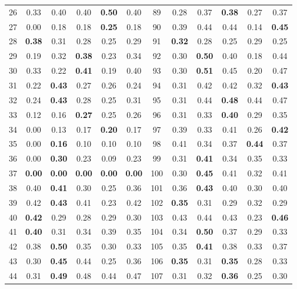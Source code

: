 \documentclass{article}
\begin{document}
{\begin{longtable}{cccccc@{\qquad}cccccc}
26 & 0.33 & 0.40 & 0.40 & \textbf{0.50} & 0.40 & 89 & 0.28 & 0.37 & \textbf{0.38} & 0.27 & 0.37 \\
27 & 0.00 & 0.18 & 0.18 & \textbf{0.25} & 0.18 & 90 & 0.39 & 0.44 & 0.44 & 0.14 & \textbf{0.45} \\
28 & \textbf{0.38} & 0.31 & 0.28 & 0.25 & 0.29 & 91 & \textbf{0.32} & 0.28 & 0.25 & 0.29 & 0.25 \\
29 & 0.19 & 0.32 & \textbf{0.38} & 0.23 & 0.34 & 92 & 0.30 & \textbf{0.50} & 0.40 & 0.18 & 0.44 \\
30 & 0.33 & 0.22 & \textbf{0.41} & 0.19 & 0.40 & 93 & 0.30 & \textbf{0.51} & 0.45 & 0.20 & 0.47 \\
31 & 0.22 & \textbf{0.43} & 0.27 & 0.26 & 0.24 & 94 & 0.31 & 0.42 & 0.42 & 0.32 & \textbf{0.43} \\
32 & 0.24 & \textbf{0.43} & 0.28 & 0.25 & 0.31 & 95 & 0.31 & 0.44 & \textbf{0.48} & 0.44 & 0.47 \\
33 & 0.12 & 0.16 & \textbf{0.27} & 0.25 & 0.26 & 96 & 0.31 & 0.33 & \textbf{0.40} & 0.29 & 0.35 \\
34 & 0.00 & 0.13 & 0.17 & \textbf{0.20} & 0.17 & 97 & 0.39 & 0.33 & 0.41 & 0.26 & \textbf{0.42} \\
35 & 0.00 & \textbf{0.16} & 0.10 & 0.10 & 0.10 & 98 & 0.41 & 0.34 & 0.37 & \textbf{0.44} & 0.37 \\
36 & 0.00 & \textbf{0.30} & 0.23 & 0.09 & 0.23 & 99 & 0.31 & \textbf{0.41} & 0.34 & 0.35 & 0.33 \\
37 & \textbf{0.00} & \textbf{0.00} & \textbf{0.00} & \textbf{0.00} & \textbf{0.00} & 100 & 0.30 & \textbf{0.45} & 0.41 & 0.32 & 0.41 \\
38 & 0.40 & \textbf{0.41} & 0.30 & 0.25 & 0.36 & 101 & 0.36 & \textbf{0.43} & 0.40 & 0.30 & 0.40 \\
39 & 0.42 & \textbf{0.43} & 0.41 & 0.23 & 0.42 & 102 & \textbf{0.35} & 0.31 & 0.29 & 0.32 & 0.29 \\
40 & \textbf{0.42} & 0.29 & 0.28 & 0.29 & 0.30 & 103 & 0.43 & 0.44 & 0.43 & 0.23 & \textbf{0.46} \\
41 & \textbf{0.40} & 0.31 & 0.34 & 0.39 & 0.35 & 104 & 0.34 & \textbf{0.50} & 0.37 & 0.29 & 0.33 \\
42 & 0.38 & \textbf{0.50} & 0.35 & 0.30 & 0.33 & 105 & 0.35 & \textbf{0.41} & 0.38 & 0.33 & 0.37 \\
43 & 0.30 & \textbf{0.45} & 0.44 & 0.25 & 0.36 & 106 & \textbf{0.35} & 0.31 & \textbf{0.35} & 0.28 & 0.33 \\
44 & 0.31 & \textbf{0.49} & 0.48 & 0.44 & 0.47 & 107 & 0.31 & 0.32 & \textbf{0.36} & 0.25 & 0.30 \\

\end{longtable}}
\end{document}
